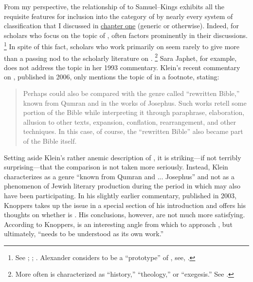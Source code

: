 From my perspective, the relationship of \chronicles to Samuel--Kings exhibits all the requisite features for inclusion into the category of \rwb by nearly every system of classification that I discussed in \hyperref[chap:rwb]{chapter one} (generic or otherwise). Indeed, for scholars who focus on the topic of \rwb, \chronicles often factors prominently in their discussions.%
    \footnote{See
        \cite{campbell_zsengeller2014};
        \cite{zahn_lim-collins2010};
        \cite{bernstein_textus2005}.
        Alexander considers \chronicles to be a ``prototype'' of \rwb, see,
        \cite[100]{alexander_carson-williamson1988}.}
In spite of this fact, scholars who work primarily on \chronicles seem rarely to give more than a passing nod to the scholarly literature on \rwb.%
    \footnote{More often \chronicles is characterized as ``history,'' ``theology,'' or ``exegesis.'' See \cite{jonker_vt2007}.}
Sara Japhet, for example, does not address the topic in her 1993 commentary.%
    \autocite{japhet1993}
Klein's recent commentary on \chronicles, published in 2006, only mentions the topic of \rwb in a footnote, stating:
\begin{quote}
    Perhaps \chronicles could also be compared with the genre called ``rewritten Bible,'' known from Qumran and in the works of Josephus. Such works retell some portion of the Bible while interpreting it through paraphrase, elaboration, allusion to other texts, expansion, conflation, rearrangement, and other techniques. In this case, of course, the ``rewritten Bible'' also became part of the Bible itself.%
    \autocite[17 n.157]{klein2006}
\end{quote}
\noindent
Setting aside Klein's rather anemic description of \rwb, it is striking---if not terribly surprising---that the comparison is not taken more seriously. Instead, Klein characterizes \rwb as a genre ``known from Qumran and ... Josephus'' and not as a phenomenon of Jewish literary production during the \secondtemple period in which \chronicles may also have been participating. In his slightly earlier commentary, published in 2003, Knoppers takes up the issue in a special section of his introduction and offers his thoughts on whether \chronicles is \rwb.%
    \autocite[129--134]{knoppers2003}
His conclusions, however, are not much more satisfying. According to Knoppers, \rwb is an interesting angle from which to approach \chronicles, but ultimately, ``\chronicles needs to be understood as its own work.''%
    \autocite[134]{knoppers2003}

